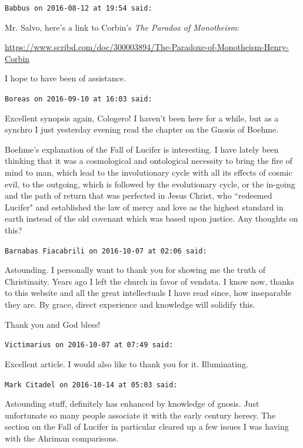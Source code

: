 \begin{footnotesize}
\begin{sffamily}
\hfill

\texttt{Babbus on 2016-08-12 at 19:54 said: }

Mr. Salvo, here's a link to Corbin's \textit{The Paradox of Monotheism}: 

\url{https://www.scribd.com/doc/300003894/The-Paradoxe-of-Monotheism-Henry-Corbin}

I hope to have been of assistance.


\hfill

\texttt{Boreas on 2016-09-10 at 16:03 said: }

Excellent synopsis again, Cologero! I haven't been here for a while, but as a synchro I just yesterday evening read the chapter on the Gnosis of Boehme.

Boehme's explanation of the Fall of Lucifer is interesting. I have lately been thinking that it was a cosmological and ontological necessity to bring the fire of mind to man, which lead to the involutionary cycle with all its effects of cosmic evil, to the outgoing, which is followed by the evolutionary cycle, or the in-going and the path of return that was perfected in Jesus Christ, who ``redeemed Lucifer" and established the law of mercy and love as the highest standard in earth instead of the old covenant which was based upon justice. Any thoughts on this?


\hfill

\texttt{Barnabas Fiacabrili on 2016-10-07 at 02:06 said: }

Astounding. I personally want to thank you for showing me the truth of Christinaity. Years ago I left the church in favor of vendata. I know now, thanks to this website and all the great intellectuals I have read since, how inseparable they are. By grace, direct experience and knowledge will solidify this.

Thank you and God bless!


\hfill

\texttt{Victimarius on 2016-10-07 at 07:49 said: }

Excellent article. I would also like to thank you for it. Illuminating.


\hfill

\texttt{Mark Citadel on 2016-10-14 at 05:03 said: }

Astounding stuff, definitely has enhanced by knowledge of gnosis. Just unfortunate so many people associate it with the early century heresy. The section on the Fall of Lucifer in particular cleared up a few issues I was having with the Ahriman comparisons.


\end{sffamily}
\end{footnotesize}
